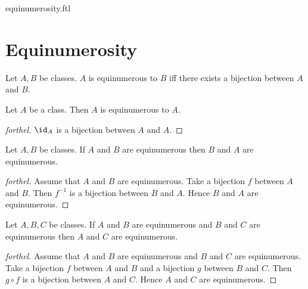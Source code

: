 \documentclass{naproche-library}
\begin{document}
\begin{smodule}{equinumerosity.ftl}

  \section*{Equinumerosity}

  \begin{definition}[forthel,id=FOUNDATIONS_13_4578620297183232]
    Let $A, B$ be classes.
    $A$ is equinumerous to $B$ iff there exists a bijection between $A$ and $B$.
  \end{definition}

  \begin{proposition}[forthel,id=FOUNDATIONS_13_3703161885818880]
    Let $A$ be a class.
    Then $A$ is equinumerous to $A$.
  \end{proposition}
  \begin{proof}[forthel]
    $\id_{A}$ is a bijection between $A$ and $A$.
  \end{proof}

  \begin{proposition}[forthel,id=FOUNDATIONS_13_8050301789536256]
    Let $A, B$ be classes.
    If $A$ and $B$ are equinumerous then $B$ and $A$ are equinumerous.
  \end{proposition}
  \begin{proof}[forthel]
    Assume that $A$ and $B$ are equinumerous.
    Take a bijection $f$ between $A$ and $B$.
    Then $f^{-1}$ is a bijection between $B$ and $A$.
    Hence $B$ and $A$ are equinumerous.
  \end{proof}

  \begin{proposition}[forthel,id=FOUNDATIONS_13_3609912414306304]
    Let $A, B, C$ be classes.
    If $A$ and $B$ are equinumerous and $B$ and $C$ are equinumerous then $A$ and $C$ are equinumerous.
  \end{proposition}
  \begin{proof}[forthel]
    Assume that $A$ and $B$ are equinumerous and $B$ and $C$ are equinumerous.
    Take a bijection $f$ between $A$ and $B$ and a bijection $g$ between $B$ and $C$.
    Then $g \circ f$ is a bijection between $A$ and $C$.
    Hence $A$ and $C$ are equinumerous.
  \end{proof}
\end{smodule}
\end{document}
